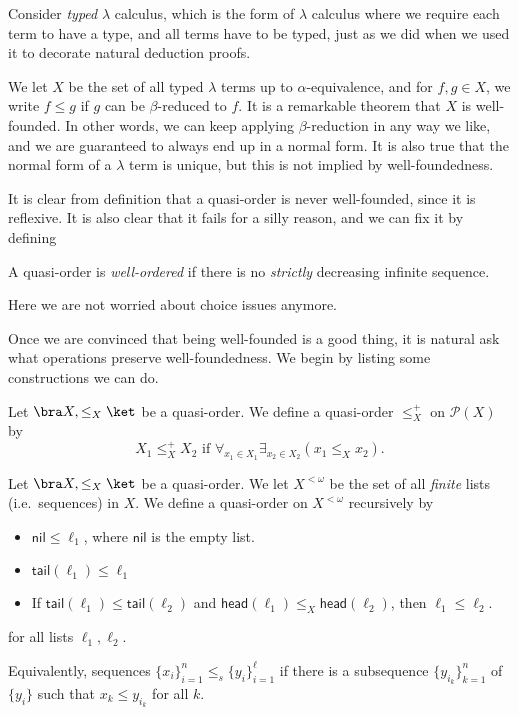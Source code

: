 \documentclass[a4paper]{article}
\newcommand\head{\mathsf{head}}
\newcommand\tail{\mathsf{tail}}
\newcommand\cnil{\mathsf{nil}}
\begin{document}
\begin{eg}
  Consider \emph{typed} $\lambda$ calculus, which is the form of $\lambda$ calculus where we require each term to have a type, and all terms have to be typed, just as we did when we used it to decorate natural deduction proofs.

  We let $X$ be the set of all typed $\lambda$ terms up to $\alpha$-equivalence, and for $f, g \in X$, we write $f \leq g$ if $g$ can be $\beta$-reduced to $f$. It is a remarkable theorem that $X$ is well-founded. In other words, we can keep applying $\beta$-reduction in any way we like, and we are guaranteed to always end up in a normal form. It is also true that the normal form of a $\lambda$ term is unique, but this is not implied by well-foundedness.
\end{eg}

It is clear from definition that a quasi-order is never well-founded, since it is reflexive. It is also clear that it fails for a silly reason, and we can fix it by defining
\begin{defi}
  A quasi-order is \emph{well-ordered} if there is no \emph{strictly} decreasing infinite sequence.
\end{defi}
Here we are not worried about choice issues anymore.

Once we are convinced that being well-founded is a good thing, it is natural ask what operations preserve well-foundedness. We begin by listing some constructions we can do.
\begin{defi}[$\mathcal{P}(X)$]\index{$\leq^+$}
  Let $\bra X, \leq_X \ket$ be a quasi-order. We define a quasi-order $\leq_X^+$ on $\mathcal{P}(X)$ by
  \[
    X_1\leq_X^+ X_2\text{ if }\forall_{x_1 \in X_1} \exists_{x_2 \in X_2} (x_1 \leq_X x_2).
  \]
\end{defi}

\begin{defi}[$X^{<\omega}$]
  Let $\bra X, \leq_X\ket$ be a quasi-order. We let $X^{<\omega}$ be the set of all \emph{finite} lists (i.e.\ sequences) in $X$. We define a quasi-order on $X^{<\omega}$ recursively by
  \begin{itemize}
    \item $\cnil \leq \ell_1$, where $\cnil$ is the empty list.
    \item $\tail (\ell_1) \leq \ell_1$
    \item If $\tail (\ell_1) \leq \tail(\ell_2)$ and $\head(\ell_1) \leq_X \head (\ell_2)$, then $\ell_1 \leq \ell_2$.
  \end{itemize}
  for all lists $\ell_1, \ell_2$.

  Equivalently, sequences $\{x_i\}_{i = 1}^n \leq_s \{y_i\}_{i = 1}^\ell$ if there is a subsequence $\{y_{i_k}\}_{k = 1}^n$ of $\{y_i\}$ such that $x_k \leq y_{i_k}$ for all $k$.
\end{defi}
\end{document}
